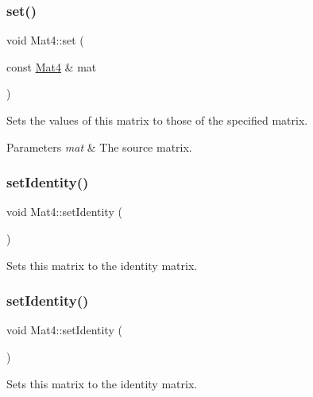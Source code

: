 \subsubsection{\texorpdfstring{set()}{set()}\hspace{0.1cm}{\footnotesize\ttfamily [6/6]}}
{\footnotesize\ttfamily void Mat4\+::set (\begin{DoxyParamCaption}\item[{const \hyperlink{classMat4}{Mat4} \&}]{mat }\end{DoxyParamCaption})}

Sets the values of this matrix to those of the specified matrix.


\begin{DoxyParams}{Parameters}
{\em mat} & The source matrix. \\
\hline
\end{DoxyParams}
\mbox{\label{classMat4_a0d20e8d7fbbc17531bb81a1446b85c98}} 
\subsubsection{\texorpdfstring{set\+Identity()}{setIdentity()}\hspace{0.1cm}{\footnotesize\ttfamily [1/2]}}
{\footnotesize\ttfamily void Mat4\+::set\+Identity (\begin{DoxyParamCaption}{ }\end{DoxyParamCaption})}

Sets this matrix to the identity matrix. \mbox{\label{classMat4_a0d20e8d7fbbc17531bb81a1446b85c98}} 
\subsubsection{\texorpdfstring{set\+Identity()}{setIdentity()}\hspace{0.1cm}{\footnotesize\ttfamily [2/2]}}
{\footnotesize\ttfamily void Mat4\+::set\+Identity (\begin{DoxyParamCaption}{ }\end{DoxyParamCaption})}

Sets this matrix to the identity matrix. \mbox{\label{classMat4_a252b7afb2cfcd5e814fa2d3118d05de3}} 
